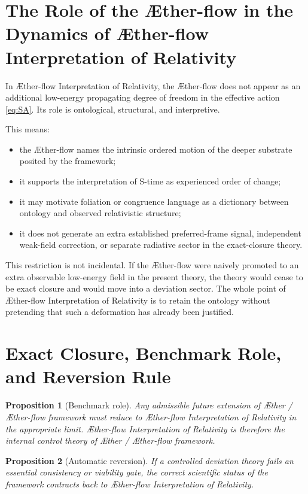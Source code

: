 \documentclass[11pt]{article}
\newcommand{\Aether}{\AE{}ther}
\newcommand{\Aflow}{\AE{}ther-flow}
\newcommand{\TheoryName}{\Aflow{} Interpretation of Relativity}
\newcommand{\TheoryProgram}{\Aether{} / \Aflow{} framework}
\newtheorem{proposition}{Proposition}
\begin{document}
\section{The Role of the \Aflow{} in the Dynamics of \TheoryName{}}

In \TheoryName{}, the \Aflow{} does not appear as an additional low-energy propagating degree of freedom in the effective action \eqref{eq:SA}. Its role is ontological, structural, and interpretive.

This means:
\begin{itemize}
    \item the \Aflow{} names the intrinsic ordered motion of the deeper substrate posited by the framework;
    \item it supports the interpretation of S-time as experienced order of change;
    \item it may motivate foliation or congruence language as a dictionary between ontology and observed relativistic structure;
    \item it does not generate an extra established preferred-frame signal, independent weak-field correction, or separate radiative sector in the exact-closure theory.
\end{itemize}

This restriction is not incidental. If the \Aflow{} were naively promoted to an extra observable low-energy field in the present theory, the theory would cease to be exact closure and would move into a deviation sector. The whole point of \TheoryName{} is to retain the ontology without pretending that such a deformation has already been justified.

\section{Exact Closure, Benchmark Role, and Reversion Rule}

\begin{proposition}[Benchmark role]
Any admissible future extension of \TheoryProgram{} must reduce to \TheoryName{} in the appropriate limit. \TheoryName{} is therefore the internal control theory of \TheoryProgram{}.
\end{proposition}

\begin{proposition}[Automatic reversion]
If a controlled deviation theory fails an essential consistency or viability gate, the correct scientific status of the framework contracts back to \TheoryName{}.
\end{proposition}
\end{document}
